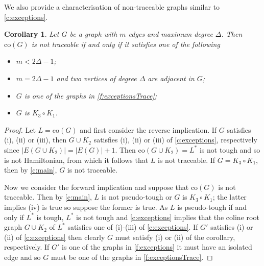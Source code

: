 \documentclass[12pt]{article}
\newtheorem{cor}[thm]{Corollary}
\theoremstyle{definition}
\newcommand{\co}{\text{co}}
\begin{document}
We also provide a characterisation of non-traceable graphs similar to \cref{c:exceptions}.
\begin{cor}\label{c:Trace}
Let $G$ be a graph with $m$ edges and maximum degree $\Delta$. Then $\co(G)$ is not traceable if and only if it satisfies one of the following
\begin{itemize}
\item[(i)] $m < 2\Delta-1$;
\item[(ii)] $m=2\Delta-1$ and two vertices of degree $\Delta$ are adjacent in $G$;
\item[(iii)] $G$ is one of the graphs in \cref{f:exceptionsTrace};
\item[(iv)] $G$ is $K_3\circ K_1$.
\end{itemize}
\end{cor}
\begin{proof}
Let $L=\co(G)$ and first consider the reverse implication.
If $G$ satisfies (i), (ii) or (iii), then $G \cup K_2$ satisfies (i), (ii) or (iii) of \cref{c:exceptions}, respectively since $|E(G \cup K_2)|=|E(G)|+1$. Then $\co(G\cup K_2)=L^*$ is not tough and so is not Hamiltonian, from which it follows that $L$ is not traceable. If $G = K_3 \circ K_1$, then by \cref{c:main}, $G$ is not traceable.

Now we consider the forward implication and suppose that $\co(G)$ is not traceable.
Then by \cref{c:main}, $L$ is not pseudo-tough or $G$ is $K_3\circ K_1$; the latter implies (iv) is true so suppose the former is true. As $L$ is pseudo-tough if and only if $L^*$ is tough, $L^*$ is not tough and \cref{c:exceptions} implies that the coline root graph $G \cup K_2$ of $L^*$ satisfies one of (i)-(iii) of \cref{c:exceptions}. 
If $G'$ satisfies (i) or (ii) of  \cref{c:exceptions} then clearly $G$ must satisfy (i) or (ii) of the corollary, respectively.
If $G'$ is one of the graphs in \cref{f:exceptions} it must have an isolated edge and so $G$ must be one of the graphs in  \cref{f:exceptionsTrace}.
\end{proof}
\end{document}
